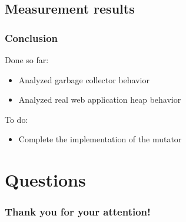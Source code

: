 \documentclass[xcolor=x11names,compress]{beamer}
\begin{document}
	\subsection{Measurement results}
	\begin{frame}
		\frametitle{Conclusion}
		Done so far:
		\begin{itemize}
			\item Analyzed garbage collector behavior
			\item Analyzed real web application heap behavior
		\end{itemize}
		To do:
		\begin{itemize}
			\item Complete the implementation of the mutator
		\end{itemize}
	\end{frame}
	
	\section{Questions}
	\begin{frame}
		\frametitle{Thank you for your attention!}
	\end{frame}
	
\end{document}
